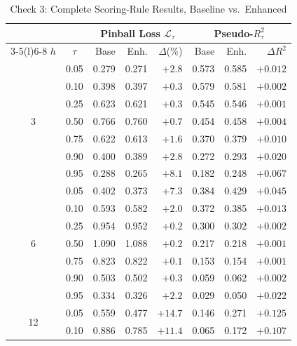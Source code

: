 \documentclass[12pt]{article}
\begin{document}
\begin{table}[htbp]\begin{center}
\caption{Check 3: Complete Scoring-Rule Results, Baseline vs.\ Enhanced}
\label{tab:pinball}
\begin{threeparttable}\small\setlength{\tabcolsep}{5.5pt}
\begin{tabular}{@{}cc *{3}{r} @{\hspace{8pt}} *{3}{r}@{}}
\toprule
 &  & \multicolumn{3}{c}{Pinball Loss $\mathcal{L}_\tau$}
    & \multicolumn{3}{c}{Pseudo-$R^2_\tau$}\\
\cmidrule(lr){3-5}\cmidrule(l){6-8}
$h$ & $\tau$ & Base & Enh. & $\Delta$(\%) & Base & Enh. & $\Delta R^2$\\
\midrule
\multirow{7}{*}{3}
 & 0.05 & 0.279 & 0.271 & $+2.8$ & 0.573 & 0.585 & $+0.012$\\
 & 0.10 & 0.398 & 0.397 & $+0.3$ & 0.579 & 0.581 & $+0.002$\\
 & 0.25 & 0.623 & 0.621 & $+0.3$ & 0.545 & 0.546 & $+0.001$\\
 & 0.50 & 0.766 & 0.760 & $+0.7$ & 0.454 & 0.458 & $+0.004$\\
 & 0.75 & 0.622 & 0.613 & $+1.6$ & 0.370 & 0.379 & $+0.010$\\
 & 0.90 & 0.400 & 0.389 & $+2.8$ & 0.272 & 0.293 & $+0.020$\\
 & 0.95 & 0.288 & 0.265 & $+8.1$ & 0.182 & 0.248 & $+0.067$\\
\midrule
\multirow{7}{*}{6}
 & 0.05 & 0.402 & 0.373 & $+7.3$ & 0.384 & 0.429 & $+0.045$\\
 & 0.10 & 0.593 & 0.582 & $+2.0$ & 0.372 & 0.385 & $+0.013$\\
 & 0.25 & 0.954 & 0.952 & $+0.2$ & 0.300 & 0.302 & $+0.002$\\
 & 0.50 & 1.090 & 1.088 & $+0.2$ & 0.217 & 0.218 & $+0.001$\\
 & 0.75 & 0.823 & 0.822 & $+0.1$ & 0.153 & 0.154 & $+0.001$\\
 & 0.90 & 0.503 & 0.502 & $+0.3$ & 0.059 & 0.062 & $+0.002$\\
 & 0.95 & 0.334 & 0.326 & $+2.2$ & 0.029 & 0.050 & $+0.022$\\
\midrule
\multirow{7}{*}{12}
 & \cellcolor{yellow!25}0.05 & \cellcolor{yellow!25}0.559 & \cellcolor{yellow!25}0.477 & \cellcolor{yellow!25}$\mathbf{+14.7}$ & \cellcolor{yellow!25}0.146 & \cellcolor{yellow!25}0.271 & \cellcolor{yellow!25}$\mathbf{+0.125}$\\
 & \cellcolor{yellow!25}0.10 & \cellcolor{yellow!25}0.886 & \cellcolor{yellow!25}0.785 & \cellcolor{yellow!25}$\mathbf{+11.4}$ & \cellcolor{yellow!25}0.065 & \cellcolor{yellow!25}0.172 & \cellcolor{yellow!25}$\mathbf{+0.107}$\\

\end{tabular}
\end{threeparttable}
\end{center}
\end{table}
\end{document}
